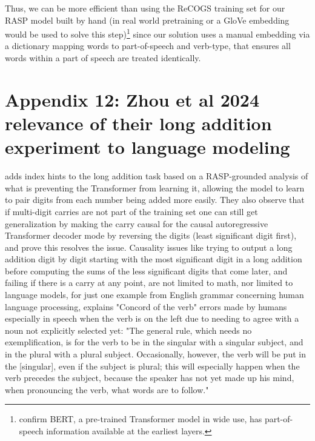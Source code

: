\documentclass[11pt]{article}
\begin{document}
Thus, we can be more efficient than using the ReCOGS training set for our RASP model built by hand (in real world pretraining or a GloVe embedding would be used to solve this step)\footnote{\cite{tenney2019bertrediscoversclassicalnlp} confirm BERT, a pre-trained Transformer model in wide use, has part-of-speech information available at the earliest layers.}
 since our solution uses a manual embedding via a dictionary mapping words to part-of-speech and verb-type, that ensures all words within a part of speech are treated identically.

\section{Appendix 12: Zhou et al 2024 relevance of their long addition experiment to language modeling}
\cite{Zhou2024} adds index hints to the long addition task based on a RASP-grounded analysis of what is preventing the Transformer from learning it, allowing the model to learn to pair digits from each number being added more easily. They also observe that if multi-digit carries are not part of the training set one can still get generalization by making the carry causal for the causal autoregressive Transformer decoder mode by reversing the digits (least significant digit first), and prove this resolves the issue. Causality issues like trying to output a long addition digit by digit starting with the most significant digit in a long addition before computing the sums of the less significant digits that come later, and failing if there is a carry at any point, are not limited to math, nor limited to language models, for just one example from English grammar concerning human language processing, \cite{jespersen1913modernenglishgrammar1954reprint} explains "Concord of the verb" errors made by humans especially in speech when the verb is on the left due to needing to agree with a noun not explicitly selected yet: "The general rule, which needs no exemplification, is for the verb to be in the singular with a singular subject, and in the plural with a plural subject. Occasionally, however, the verb will be put in the [singular], even if the subject is plural; this will especially happen when the verb precedes the subject, because the speaker has not yet made up his mind, when pronouncing the verb, what words are to follow."
\end{document}
